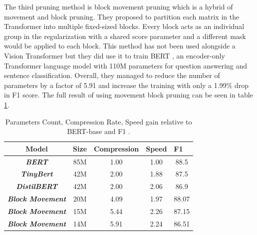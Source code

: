 The third pruning method is block movement pruning \cite{pruning-block} which is a hybrid of movement and block pruning. They proposed to partition each matrix in the Transformer into multiple fixed-sized blocks. Every block acts as an individual group in the regularization with a shared score parameter and a different mask would be applied to each block. This method has not been used alongside a Vision Transformer but they did use it to train BERT \cite{bert}, an encoder-only Transformer language model with 110M parameters for question answering and sentence classification. Overall, they managed to reduce the number of parameters by a factor of 5.91 and increase the training with only a 1.99\% drop in F1 score. The full result of using movement block pruning can be seen in table \ref{tab:block-movement}.
\FloatBarrier
\begin{table}[!h]
\centering
\begin{tabular}{|c|c|c|c|c|}
\hline
\textbf{Model}                   & \textbf{Size}               & \textbf{Compression}         & \multicolumn{1}{l|}{\textbf{Speed}} & \multicolumn{1}{l|}{\textbf{F1}} \\ \hline
\textit{\textbf{BERT}}           & \cellcolor[HTML]{FFFFFF}85M & \cellcolor[HTML]{FFFFFF}1.00 & \cellcolor[HTML]{FFFFFF}1.00        & \cellcolor[HTML]{FFFFFF}88.5     \\ \hline
\textit{\textbf{TinyBert}}       & \cellcolor[HTML]{FFFFFF}42M & \cellcolor[HTML]{FFFFFF}2.00 & \cellcolor[HTML]{FFFFFF}1.88        & \cellcolor[HTML]{FFFFFF}87.5     \\ \hline
\textit{\textbf{DistilBERT}}     & \cellcolor[HTML]{FFFFFF}42M & \cellcolor[HTML]{FFFFFF}2.00 & \cellcolor[HTML]{FFFFFF}2.06        & \cellcolor[HTML]{FFFFFF}86.9     \\ \hline
\textit{\textbf{Block Movement}} & \cellcolor[HTML]{FFFFFF}20M & \cellcolor[HTML]{FFFFFF}4.09 & \cellcolor[HTML]{FFFFFF}1.97        & \cellcolor[HTML]{FFFFFF}88.07    \\ \hline
\textit{\textbf{Block Movement}} & \cellcolor[HTML]{FFFFFF}15M & \cellcolor[HTML]{FFFFFF}5.44 & \cellcolor[HTML]{FFFFFF}2.26        & \cellcolor[HTML]{FFFFFF}87.15    \\ \hline
\textit{\textbf{Block Movement}} & \cellcolor[HTML]{FFFFFF}14M & \cellcolor[HTML]{FFFFFF}5.91 & \cellcolor[HTML]{FFFFFF}2.24        & \cellcolor[HTML]{FFFFFF}86.51    \\ \hline
\end{tabular}
\caption{Parameters Count, Compression Rate, Speed gain relative to BERT-base and F1 \cite{pruning-block}.}
\label{tab:block-movement}
\end{table}
\FloatBarrier
